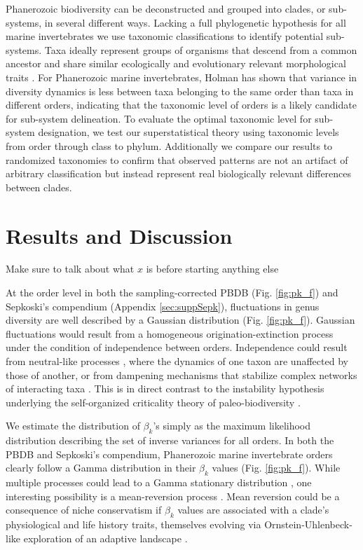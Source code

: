 \documentclass[12pt]{article}
\let\citep=\autocite
\begin{document}
Phanerozoic biodiversity can be deconstructed and grouped into clades,
or sub-systems, in several different ways. Lacking a full phylogenetic
hypothesis for all marine invertebrates we use taxonomic
classifications to identify potential sub-systems.  Taxa ideally
represent groups of organisms that descend from a common ancestor and
share similar ecologically and evolutionary relevant morphological
traits \citep{mayr1965systZool, erwin2007}.  For Phanerozoic marine
invertebrates, Holman \citep{holman1989} has shown that variance in
diversity dynamics is less between taxa belonging to the same order
than taxa in different orders, indicating that the taxonomic level of
orders is a likely candidate for sub-system delineation. To evaluate
the optimal taxonomic level for sub-system designation, we test our
superstatistical theory using taxonomic levels from order through
class to phylum. Additionally we compare our results to randomized
taxonomies to confirm that observed patterns are not an artifact of
arbitrary classification but instead represent real biologically
relevant differences between clades.



\section{Results and Discussion}
Make sure to talk about what $x$ is before starting anything else 

At the order level in both the sampling-corrected PBDB
(Fig. \ref{fig:pk_f}) and Sepkoski's compendium (Appendix
\ref{sec:suppSepk}), fluctuations in genus diversity are well
described by a Gaussian distribution (Fig. \ref{fig:pk_f}). Gaussian
fluctuations would result from a homogeneous origination-extinction
process under the condition of independence between
orders. Independence could result from neutral-like processes
\citep{hubbell2001}, where the dynamics of one taxon are unaffected by
those of another, or from dampening mechanisms that stabilize complex
networks of interacting taxa \citep{brose2005}. This is in direct
contrast to the instability hypothesis underlying the self-organized
criticality theory of paleo-biodiversity \citep{bak1993, sole1997}.

We estimate the distribution of $\beta_k$'s simply as the maximum
likelihood distribution describing the set of inverse variances for
all orders. In both the PBDB and Sepkoski's compendium, Phanerozoic
marine invertebrate orders clearly follow a Gamma distribution in
their $\beta_k$ values (Fig. \ref{fig:pk_f}).  While multiple
processes could lead to a Gamma stationary distribution
\citep[e.g.][]{cir1985}, one interesting possibility is a
mean-reversion process \citep{cir1985}. Mean reversion could be a
consequence of niche conservatism if $\beta_k$ values are associated
with a clade's physiological and life history traits, themselves
evolving via Ornstein-Uhlenbeck-like exploration of an adaptive
landscape \citep{cir1985, butler2004}.
\end{document}

